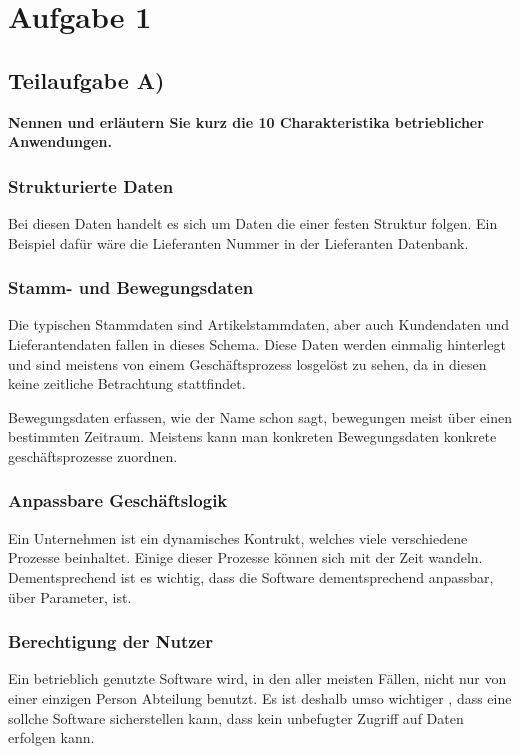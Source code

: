 \section{Aufgabe 1}

\subsection{Teilaufgabe A)}
\textbf{Nennen und erläutern Sie kurz die 10 Charakteristika betrieblicher
Anwendungen.}

\subsubsection{Strukturierte Daten}
Bei diesen Daten handelt es sich um Daten die einer festen Struktur folgen.
Ein Beispiel dafür wäre die Lieferanten Nummer in der Lieferanten Datenbank.

\subsubsection{Stamm- und Bewegungsdaten}
Die typischen Stammdaten sind Artikelstammdaten, aber auch Kundendaten und
Lieferantendaten fallen in dieses Schema. Diese Daten werden einmalig
hinterlegt und sind meistens von einem Geschäftsprozess losgelöst zu sehen, da
in diesen keine zeitliche Betrachtung stattfindet.

Bewegungsdaten erfassen, wie der Name schon sagt, bewegungen meist über einen
bestimmten Zeitraum. Meistens kann man konkreten Bewegungsdaten konkrete
geschäftsprozesse zuordnen.

\subsubsection{Anpassbare Geschäftslogik}
Ein Unternehmen ist ein dynamisches Kontrukt, welches viele verschiedene
Prozesse beinhaltet. Einige dieser Prozesse können sich mit der Zeit wandeln.
Dementsprechend ist es wichtig, dass die Software dementsprechend anpassbar, \zB
über Parameter, ist.

\subsubsection{Berechtigung der Nutzer}
Ein betrieblich genutzte Software wird, in den aller meisten Fällen, nicht nur
von einer einzigen Person \bzw Abteilung benutzt. Es ist deshalb umso wichtiger
, dass eine sollche Software sicherstellen kann, dass kein unbefugter Zugriff
auf Daten erfolgen kann.

